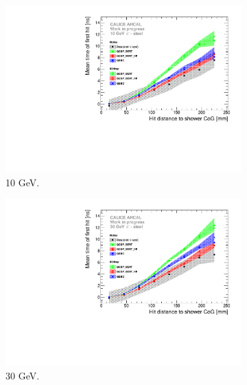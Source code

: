 \begin{figure}[htbp!]
  \begin{subfigure}[t]{0.5\textwidth}
    \centering
    \includegraphics[width=1\textwidth]{../Thesis_Plots/Timing/Pions/Plots/ComparisonToSim/Time_Radius_10GeV_SSF.pdf}
    \caption{10 GeV.} \label{fig:Radius_SSF_SimData_10GeV}
  \end{subfigure}
  \hfill
  \begin{subfigure}[t]{0.5\textwidth}
    \centering
    \includegraphics[width=1\textwidth]{../Thesis_Plots/Timing/Pions/Plots/ComparisonToSim/Time_Radius_30GeV_SSF.pdf}
    \caption{30 GeV.} \label{fig:Radius_SSF_SimData_30GeV}
  \end{subfigure}
  \hfill
  \begin{subfigure}[t]{0.5\textwidth}
    \centering

\end{subfigure}
\end{figure}
